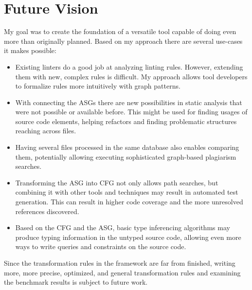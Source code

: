 \chapter{Future Vision}
\label{chap:future-vision}

My goal was to create the foundation of a versatile tool capable of doing even more than originally planned. Based on my approach there are several use-cases it makes possible:

\begin{itemize}[topsep=0pt]
  \item Existing linters do a good job at analyzing linting rules. However, extending them with new, complex rules is difficult. My approach allows tool developers to formalize rules more intuitively with graph patterns.

  \item With connecting the ASGs there are new possibilities in static analysis that were not possible or available before. This might be used for finding usages of source code elements, helping refactors and finding problematic structures reaching across files.

  \item Having several files processed in the same database also enables comparing them, potentially allowing executing sophisticated graph-based plagiarism searches.

  \item Transforming the ASG into CFG not only allows path searches, but combining it with other tools and techniques may result in automated test generation. This can result in higher code coverage and the more unresolved references discovered.

  \item Based on the CFG and the ASG, basic type inferencing algorithms may produce typing information in the untyped source code, allowing even more ways to write queries and constraints on the source code.
\end{itemize}

Since the transformation rules in the framework are far from finished, writing more, more precise, optimized, and general transformation rules and examining the benchmark results is subject to future work.

